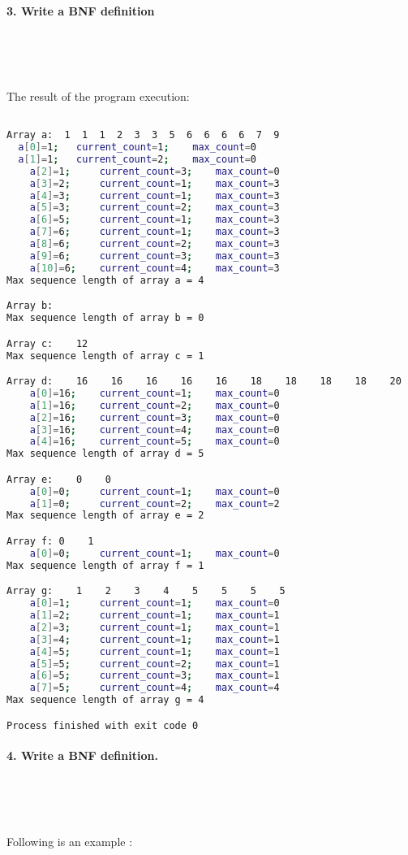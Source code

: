 \documentclass{article}
\begin{document}
	
	
	
	\paragraph{3. Write a BNF definition }\
	
	\rmfamily\
	
		The result of the program execution:
		
	\ttfamily
	\begin{lstlisting}[language=bash]

Array a:  1  1  1  2  3  3  5  6  6  6  6  7  9    
  a[0]=1; 	current_count=1; 	max_count=0
  a[1]=1; 	current_count=2; 	max_count=0
	a[2]=1; 	current_count=3; 	max_count=0
	a[3]=2; 	current_count=1; 	max_count=3
	a[4]=3; 	current_count=1; 	max_count=3
	a[5]=3; 	current_count=2; 	max_count=3
	a[6]=5; 	current_count=1; 	max_count=3
	a[7]=6; 	current_count=1; 	max_count=3
	a[8]=6; 	current_count=2; 	max_count=3
	a[9]=6; 	current_count=3; 	max_count=3
	a[10]=6; 	current_count=4; 	max_count=3
Max sequence length of array a = 4

Array b:    
Max sequence length of array b = 0

Array c:    12    
Max sequence length of array c = 1

Array d:    16    16    16    16    16    18    18    18    18    20    
	a[0]=16; 	current_count=1; 	max_count=0
	a[1]=16; 	current_count=2; 	max_count=0
	a[2]=16; 	current_count=3; 	max_count=0
	a[3]=16; 	current_count=4; 	max_count=0
	a[4]=16; 	current_count=5; 	max_count=0
Max sequence length of array d = 5

Array e:    0    0    
	a[0]=0; 	current_count=1; 	max_count=0
	a[1]=0; 	current_count=2; 	max_count=2
Max sequence length of array e = 2

Array f: 0    1    
	a[0]=0; 	current_count=1; 	max_count=0
Max sequence length of array f = 1

Array g:    1    2    3    4    5    5    5    5    
	a[0]=1; 	current_count=1; 	max_count=0
	a[1]=2; 	current_count=1; 	max_count=1
	a[2]=3; 	current_count=1; 	max_count=1
	a[3]=4; 	current_count=1; 	max_count=1
	a[4]=5; 	current_count=1; 	max_count=1
	a[5]=5; 	current_count=2; 	max_count=1
	a[6]=5; 	current_count=3; 	max_count=1
	a[7]=5; 	current_count=4; 	max_count=4
Max sequence length of array g = 4

Process finished with exit code 0

	\end{lstlisting}
	
	

	
	
	\rmfamily
	
	\paragraph{4. Write a BNF definition. }\
	
	\rmfamily\

	
		Following is an example :
		
	\ttfamily\

	
\end{document}
